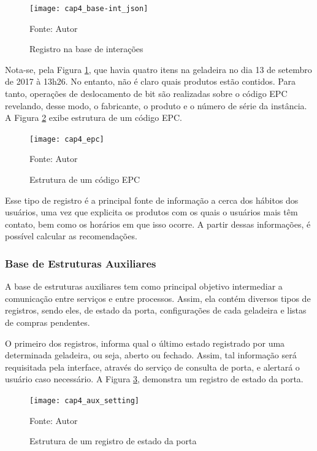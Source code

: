 \begin{figure}[htb]
    \caption{Registro na base de interações}
    \label{fig:cap4_base-int_json}
    \texttt{[image: cap4\_base-int\_json]}
    
    Fonte: Autor
\end{figure}

Nota-se, pela Figura \ref{fig:cap4_base-int_json}, que havia quatro itens na geladeira no dia 13 de setembro de 2017 à 13h26. No entanto, não é claro quais produtos estão contidos. Para tanto, operações de deslocamento de bit são realizadas sobre o código EPC revelando, desse modo, o fabricante, o produto e o número de série da instância. A Figura \ref{fig:cap4_epc} exibe estrutura de um código EPC.

\begin{figure}[htb]
    \caption{Estrutura de um código EPC}
    \label{fig:cap4_epc}
    \texttt{[image: cap4\_epc]}
    
    Fonte: Autor
\end{figure}

Esse tipo de registro é a principal fonte de informação a cerca dos hábitos dos usuários, uma vez que explicita os produtos com os quais o usuários mais têm contato, bem como os horários em que isso ocorre. A partir dessas informações, é possível calcular as recomendações.


\subsubsection{Base de Estruturas Auxiliares}  \label{sssec:base_est-aux}

A base de estruturas auxiliares tem como principal objetivo intermediar a comunicação entre serviços e entre processos. Assim, ela contém diversos tipos de registros, sendo eles, de estado da porta, configurações de cada geladeira e listas de compras pendentes.

O primeiro dos registros, informa qual o último estado registrado por uma determinada geladeira, ou seja, aberto ou fechado. Assim, tal informação será requisitada pela interface, através do serviço de consulta de porta, e alertará o usuário caso necessário. A Figura \ref{fig:cap4_aux_setting}, demonstra um registro de estado da porta.

\begin{figure}[htb]
    \caption{Estrutura de um registro de estado da porta}
    \label{fig:cap4_aux_setting}
    \texttt{[image: cap4\_aux\_setting]}
    
    Fonte: Autor
\end{figure}

